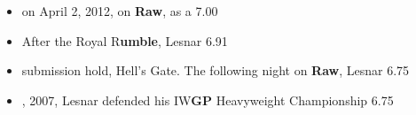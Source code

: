 \begin{itemize}[leftmargin=*,itemsep=0pt]
\item on April 2, 2012, on \textbf{\textcolor{chatframe}{Raw}}, as a \hfill 7.00
\item After the Royal R\textbf{\textcolor{chatframe}{umble}}, Lesnar \hfill 6.91
\item submission hold, Hell's Gate. The following night on \textbf{\textcolor{chatframe}{Raw}}, Lesnar \hfill 6.75
\item , 2007, Lesnar defended his IW\textbf{\textcolor{chatframe}{GP}} Heavyweight Championship \hfill 6.75
\end{itemize}
